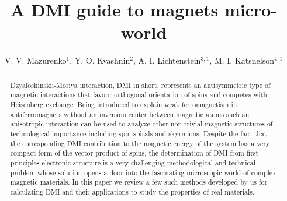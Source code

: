 \documentclass[aps,prl,twocolumn,showpacs,amsmath,amssymb]{revtex4-1}
\begin{document}
\title{A DMI guide to magnets micro-world}
\author{ V. V. Mazurenko$^1$, Y. O. Kvashnin$^{2}$, A. I. Lichtenstein$^{3,1}$, M. I. Katsnelson$^{4,1}$}


\begin{abstract}
Dzyaloshinskii-Moriya interaction, DMI in short, represents an antisymmetric type of magnetic interactions that favour orthogonal orientation of spins and competes with Heisenberg exchange. Being introduced to explain weak ferromagnetism in antiferromagnets without an inversion center between magnetic atoms such an anisotropic interaction can be used to analyze other non-trivial magnetic structures of technological importance including spin spirals and skyrmions. Despite the fact that the corresponding DMI contribution to the magnetic energy of the system has a very compact form of the vector product of spins, the determination of DMI from first-principles electronic structure is a very challenging methodological and technical problem whose solution opens a door into the fascinating microscopic world of complex magnetic materials. In this paper we review a few such methods developed by us for calculating DMI and their applications to study the properties of real materials.
\end{abstract}

\maketitle
\end{document}
